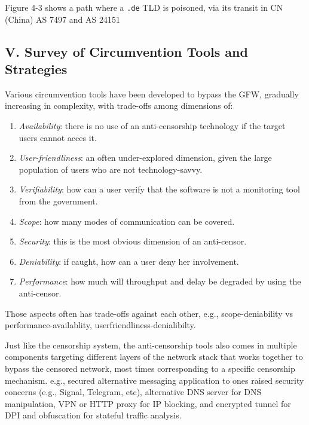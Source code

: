 Figure 4-3 shows a path where a \texttt{.de} TLD is poisoned, via its
transit in CN (China) AS 7497 and AS 24151

\hypertarget{v.-survey-of-circumvention-tools-and-strategies}{%
\subsection{V. Survey of Circumvention Tools and
Strategies}\label{v.-survey-of-circumvention-tools-and-strategies}}

Various circumvention tools have been developed to bypass the GFW,
gradually increasing in complexity, with trade-offs among dimensions of:
\cite{07_taxonomy}

\begin{enumerate}
\def\labelenumi{\arabic{enumi}.}
\item
  \emph{Availability}: there is no use of an anti-censorship technology
  if the target users cannot acces it.
\item
  \emph{User-friendliness}: an often under-explored dimension, given the
  large population of users who are not technology-savvy.
\item
  \emph{Verifiability}: how can a user verify that the software is not a
  monitoring tool from the government.
\item
  \emph{Scope}: how many modes of communication can be covered.
\item
  \emph{Security}: this is the most obvious dimension of an anti-censor.
\item
  \emph{Deniability}: if caught, how can a user deny her involvement.
\item
  \emph{Performance}: how much will throughput and delay be degraded by
  using the anti-censor.
\end{enumerate}

Those aspects often has trade-offs against each other, e.g.,
scope-deniability vs performance-availablity,
userfriendliness-denialibilty.

Just like the censorship system, the anti-censorship tools also comes in
multiple components targeting different layers of the network stack that
works together to bypass the censored network, most times corresponding
to a specific censorship mechanism. e.g., secured alternative messaging
application to ones raised security concerns (e.g., Signal, Telegram,
etc), alternative DNS server for DNS manipulation, VPN or HTTP proxy for
IP blocking, and encrypted tunnel for DPI and obfuscation for stateful
traffic analysis. \cite{48_globalDefeat}


